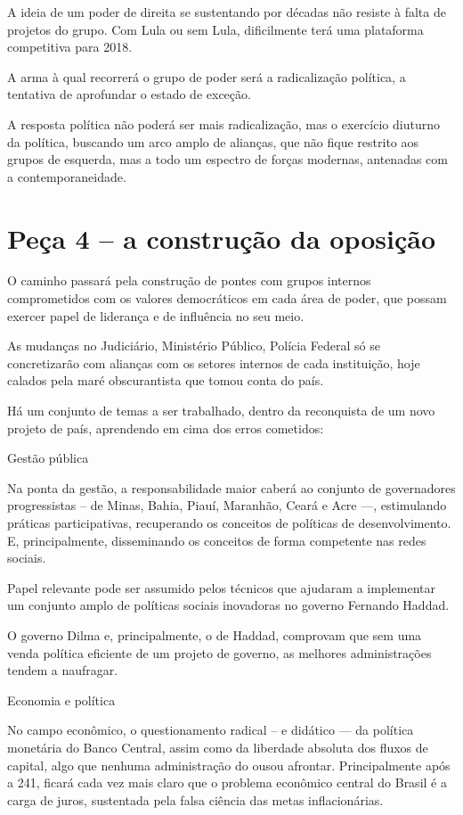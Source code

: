 A ideia de um poder de direita se sustentando por décadas não resiste à
falta de projetos do grupo. Com Lula ou sem Lula, dificilmente terá uma
plataforma competitiva para 2018.

A arma à qual recorrerá o grupo de poder será a radicalização política,
a tentativa de aprofundar o estado de exceção.

A resposta política não poderá ser mais radicalização, mas o exercício
diuturno da política, buscando um arco amplo de alianças, que não fique
restrito aos grupos de esquerda, mas a todo um espectro de forças
modernas, antenadas com a contemporaneidade.

\section{Peça 4 -- a construção da oposição}

O caminho passará pela construção de pontes com grupos internos
comprometidos com os valores democráticos em cada área de poder, que
possam exercer papel de liderança e de influência no seu meio.

As mudanças no Judiciário, Ministério Público, Polícia Federal só se
concretizarão com alianças com os setores internos de cada instituição,
hoje calados pela maré obscurantista que tomou conta do país.

Há um conjunto de temas a ser trabalhado, dentro da reconquista de um
novo projeto de país, aprendendo em cima dos erros cometidos:

Gestão pública

Na ponta da gestão, a responsabilidade maior caberá ao conjunto de
governadores progressistas -- de Minas, Bahia, Piauí, Maranhão, Ceará e
Acre \mbox{---,} estimulando práticas participativas, recuperando os conceitos
de políticas de desenvolvimento. E, principalmente, disseminando os
conceitos de forma competente nas redes sociais.

Papel relevante pode ser assumido pelos técnicos que ajudaram a
implementar um conjunto amplo de políticas sociais inovadoras no governo
Fernando Haddad.

O governo Dilma e, principalmente, o de Haddad, comprovam que sem uma
venda política eficiente de um projeto de governo, as melhores
administrações tendem a naufragar.

Economia e política

No campo econômico, o questionamento radical -- e didático --- da
política monetária do Banco Central, assim como da liberdade absoluta
dos fluxos de capital, algo que nenhuma administração do  ousou
afrontar. Principalmente após a  241, ficará cada vez mais claro que
o problema econômico central do Brasil é a carga de juros, sustentada
pela falsa ciência das metas inflacionárias.

